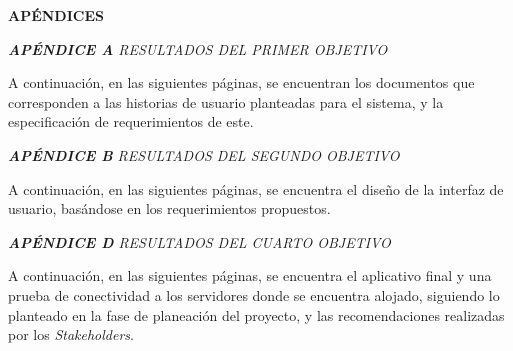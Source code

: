 \documentclass[spanish]{ieee_upb}
\begin{document}
\newpage
{}
\begin{center}
\textbf{APÉNDICES}
\end{center}
\appendix

\raggedright\textit{\textbf{APÉNDICE A} RESULTADOS DEL PRIMER OBJETIVO}
\label{APÉNDICE:a}

A continuación, en las siguientes páginas, se encuentran los documentos que corresponden a las historias de usuario planteadas para el sistema, y la especificación de requerimientos de este. 






\raggedright\textit{\textbf{APÉNDICE B} RESULTADOS DEL SEGUNDO OBJETIVO}
\label{APÉNDICE:b}

A continuación, en las siguientes páginas, se encuentra el diseño de la interfaz de usuario, basándose en los requerimientos propuestos. 



\raggedright\textit{\textbf{APÉNDICE D} RESULTADOS DEL CUARTO OBJETIVO}
\label{APÉNDICE:b}

A continuación, en las siguientes páginas, se encuentra el aplicativo final y una prueba de conectividad a los servidores donde se encuentra alojado, siguiendo lo planteado en la fase de planeación del proyecto, y las recomendaciones realizadas por los \textit{Stakeholders}. 


\end{document}
